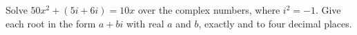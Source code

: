 Solve $50x^2+(5i+6i)=10x$ over the complex numbers, where $i^2=-1$. Give each root in the form $a+bi$ with real $a$ and $b$, exactly and to four decimal places.

